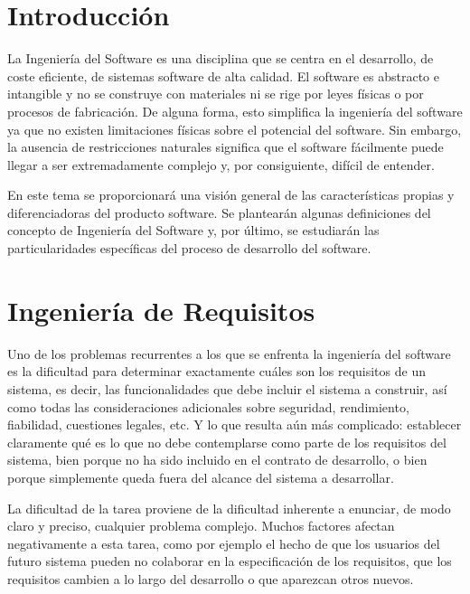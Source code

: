 \documentclass[a4paper,12pt]{book}
\begin{document}
\chapter{Introducción}

La Ingeniería del Software es una disciplina que se centra en el desarrollo, de coste eficiente, de sistemas software de alta calidad. El software es abstracto e intangible y no se construye con materiales ni se rige por leyes físicas o por procesos de fabricación. De alguna forma, esto simplifica la ingeniería del software ya que no existen limitaciones físicas sobre el potencial del software. Sin embargo, la ausencia de restricciones naturales significa que el software fácilmente puede llegar a ser extremadamente complejo y, por consiguiente, difícil de entender.

En este tema se proporcionará una visión general de las características propias y diferenciadoras del producto software. Se plantearán algunas definiciones del concepto de Ingeniería del Software y, por último, se estudiarán las particularidades específicas del proceso de desarrollo del software.




\chapter{Ingeniería de Requisitos}

Uno de los problemas recurrentes a los que se enfrenta la ingeniería del software es la dificultad para determinar exactamente cuáles son los requisitos de un sistema, es decir, las funcionalidades que debe incluir el sistema a construir, así como todas las consideraciones adicionales sobre seguridad, rendimiento, fiabilidad, cuestiones legales, etc. Y lo que resulta aún más complicado: establecer claramente qué es lo que no debe contemplarse como parte de los requisitos del sistema, bien porque no ha sido incluido en el contrato de desarrollo, o bien porque simplemente queda fuera del alcance del sistema a desarrollar.

La dificultad de la tarea proviene de la dificultad inherente a enunciar, de modo claro y preciso, cualquier problema complejo. Muchos factores afectan negativamente a esta tarea, como por ejemplo el hecho de que los usuarios del futuro sistema pueden no colaborar en la especificación de los requisitos, que los requisitos cambien a lo largo del desarrollo o que aparezcan otros nuevos.
\end{document}
